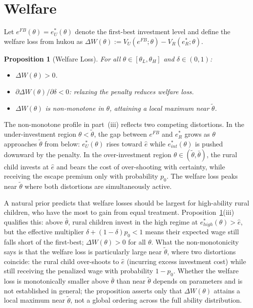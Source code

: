 \documentclass[12pt]{article}
\theoremstyle{plain}
\newtheorem{proposition}{Proposition}
\theoremstyle{definition}
\theoremstyle{remark}
\begin{document}
\section{Welfare}

Let $e^{FB}(\theta)=e^{*}_{U}(\theta)$ denote the first-best investment level
and define the welfare loss from hukou as
$\Delta W(\theta):=V_{U}(e^{FB};\theta)-V_{R}(e^{*}_{R};\theta)$.

\begin{proposition}[Welfare Loss]
\label{prop:welfare}
For all $\theta\in[\theta_{L},\theta_{H}]$ and $\delta\in(0,1)$:
\begin{itemize}
  \item[\textit{(i)}] $\Delta W(\theta)>0$.
  \item[\textit{(ii)}] $\partial\Delta W(\theta)/\partial\delta<0$: relaxing the
    penalty reduces welfare loss.
  \item[\textit{(iii)}] $\Delta W(\theta)$ is non-monotone in $\theta$, attaining
    a local maximum near $\tilde{\theta}$.
\end{itemize}
\end{proposition}

The non-monotone profile in part~(iii) reflects two competing distortions.  In
the under-investment region $\theta<\tilde{\theta}$, the gap between $e^{FB}$ and
$e^{*}_{R}$ grows as $\theta$ approaches $\tilde{\theta}$ from below:
$e^{*}_{U}(\theta)$ rises toward $\hat{e}$ while $e^{*}_{int}(\theta)$ is pushed
downward by the penalty.  In the over-investment region $\theta\in(\tilde{\theta},
\bar{\theta})$, the rural child invests at $\hat{e}$ and bears the cost of
over-shooting with certainty, while receiving the escape premium only with
probability $p_{0}$.  The welfare loss peaks near $\tilde{\theta}$ where both
distortions are simultaneously active.

A natural prior predicts that welfare losses should be largest for high-ability
rural children, who have the most to gain from equal treatment.
Proposition~\ref{prop:welfare}(iii) qualifies this: above $\bar{\theta}$, rural
children invest in the high regime at $e^{*}_{high}(\theta)>\hat{e}$, but the
effective multiplier $\delta+(1-\delta)p_{0}<1$ means their expected wage still
falls short of the first-best; $\Delta W(\theta)>0$ for all $\theta$.  What the
non-monotonicity says is that the welfare loss is particularly large near
$\tilde{\theta}$, where two distortions coincide: the rural child over-shoots to
$\hat{e}$ (incurring excess investment cost) while still receiving the penalized
wage with probability $1-p_{0}$.  Whether the welfare loss is monotonically
smaller above $\bar{\theta}$ than near $\tilde{\theta}$ depends on parameters and
is not established in general; the proposition asserts only that $\Delta W(\theta)$
attains a local maximum near $\tilde{\theta}$, not a global ordering across the
full ability distribution.
\end{document}
